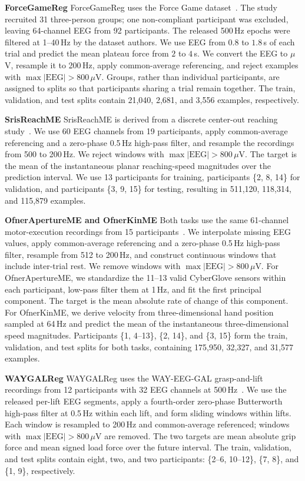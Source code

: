 \noindent\textbf{ForceGameReg}
ForceGameReg uses the Force Game dataset~\citep{li2026forcegame}. The study recruited 31 three-person groups; one non-compliant participant was excluded, leaving 64-channel EEG from 92 participants. The released 500\,Hz epochs were filtered at 1--40\,Hz by the dataset authors. We use EEG from $0.8$ to $1.8$\,s of each trial and predict the mean plateau force from $2$ to $4$\,s. We convert the EEG to $\mu$V, resample it to 200\,Hz, apply common-average referencing, and reject examples with $\max |\mathrm{EEG}|>800\,\mu$V. Groups, rather than individual participants, are assigned to splits so that participants sharing a trial remain together. The train, validation, and test splits contain 21,040, 2,681, and 3,556 examples, respectively.

\noindent\textbf{SrisReachME}
SrisReachME is derived from a discrete center-out reaching study~\citep{srisrisawang2024simultaneous}. We use 60 EEG channels from 19 participants, apply common-average referencing and a zero-phase 0.5\,Hz high-pass filter, and resample the recordings from 500 to 200\,Hz. We reject windows with $\max |\mathrm{EEG}|>800\,\mu$V. The target is the mean of the instantaneous planar reaching-speed magnitudes over the prediction interval. We use 13 participants for training, participants \{2, 8, 14\} for validation, and participants \{3, 9, 15\} for testing, resulting in 511,120, 118,314, and 115,879 examples.

\noindent\textbf{OfnerApertureME and OfnerKinME}
Both tasks use the same 61-channel motor-execution recordings from 15 participants~\citep{ofner2017upper}. We interpolate missing EEG values, apply common-average referencing and a zero-phase 0.5\,Hz high-pass filter, resample from 512 to 200\,Hz, and construct continuous windows that include inter-trial rest. We remove windows with $\max |\mathrm{EEG}|>800\,\mu$V. For OfnerApertureME, we standardize the 11--13 valid CyberGlove sensors within each participant, low-pass filter them at 1\,Hz, and fit the first principal component. The target is the mean absolute rate of change of this component. For OfnerKinME, we derive velocity from three-dimensional hand position sampled at 64\,Hz and predict the mean of the instantaneous three-dimensional speed magnitudes. Participants \{1, 4--13\}, \{2, 14\}, and \{3, 15\} form the train, validation, and test splits for both tasks, containing 175,950, 32,327, and 31,577 examples.

\noindent\textbf{WAYGALReg}
WAYGALReg uses the WAY-EEG-GAL grasp-and-lift recordings from 12 participants with 32 EEG channels at 500\,Hz~\citep{luciw2014multichannel}. We use the released per-lift EEG segments, apply a fourth-order zero-phase Butterworth high-pass filter at 0.5\,Hz within each lift, and form sliding windows within lifts. Each window is resampled to 200\,Hz and common-average referenced; windows with $\max |\mathrm{EEG}|>800\,\mu$V are removed. The two targets are mean absolute grip force and mean signed load force over the future interval. The train, validation, and test splits contain eight, two, and two participants: \{2--6, 10--12\}, \{7, 8\}, and \{1, 9\}, respectively.

